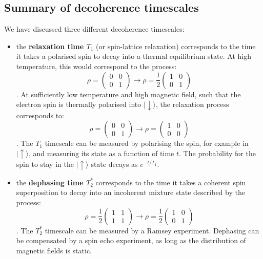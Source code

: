 \documentclass[a4paper,11pt]{article}
\newcommand{\ket}[1]{| #1 \rangle}
\begin{document}
\subsection {Summary of decoherence timescales}
We have discussed three different decoherence timescales:
\begin{itemize}
    \item the {\bf relaxation time $T_1$} (or spin-lattice relaxation) corresponds to the time it takes a polarised spin to decay into a thermal equilibrium state. At high temperature, this would correspond to the process:
    \begin{equation}
    \rho = \left(\begin{array}{cc}
        0 & 0\\
        0 & 1\end{array} \right) 
        \longrightarrow 
        \rho = \frac{1}{2} \left(\begin{array}{cc}
        1 & 0\\
        0 & 1\end{array} \right) 
    \end{equation}.
    At sufficiently low temperature and high magnetic field, such that the electron spin is thermally polarised into $\ket{\downarrow}$, the relaxation process corresponds to:
    \begin{equation}
    \rho = \left(\begin{array}{cc}
        0 & 0\\
        0 & 1\end{array} \right) 
        \longrightarrow 
        \rho =  \left(\begin{array}{cc}
        1 & 0\\
        0 & 0\end{array} \right) 
    \end{equation}.    
    The $T_1$ timescale can be measured by polarising the spin, for example in $\ket{\uparrow}$, and measuring its state as a function of time $t$. The probability for the spin to stay in the $\ket{\uparrow}$ state decays as $e^{-t/T_1}$.
    
    \item the {\bf dephasing time $T_2^*$} corresponds to the time it takes a coherent  spin superposition to decay into an incoherent mixture state described by the process:
    \begin{equation}
    \rho = \frac{1}{2}\left(\begin{array}{cc}
        1 & 1\\
        1 & 1\end{array} \right) 
        \longrightarrow 
        \rho = \frac{1}{2} \left(\begin{array}{cc}
        1 & 0\\
        0 & 1\end{array} \right) 
    \end{equation}.
    The $T_2^*$ timescale can be measured by a Ramsey experiment. Dephasing can be compensated by a spin echo experiment, as long as the distribution of magnetic fields is static.


\end{itemize}
\end{document}
